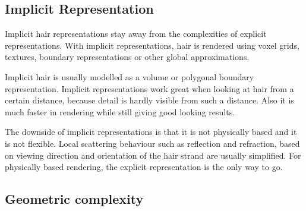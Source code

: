 \documentclass[11pt,a4paper]{report}
\begin{document}
\subsection{Implicit Representation}

Implicit hair representations stay away from the complexities of explicit representations. With implicit representations, hair is rendered using voxel grids, textures, boundary representations or other global approximations.

Implicit hair is usually modelled as a volume or polygonal boundary representation. Implicit representations work great when looking at hair from a certain distance, because detail is hardly visible from such a distance. Also it is much faster in rendering while still giving good looking results.









The downside of implicit representations is that it is not physically based and it is not flexible. Local scattering behaviour such as reflection and refraction, based on viewing direction and orientation of the hair strand are usually simplified. For physically based rendering, the explicit representation is the only way to go.

\subsection{Geometric complexity}
\end{document}
